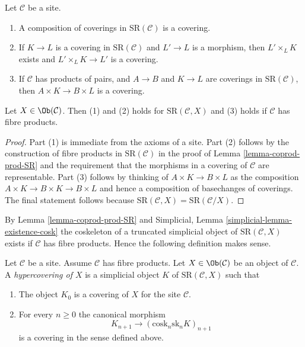 \begin{lemma}
\label{lemma-covering-permanence}
Let $\mathcal{C}$ be a site.
\begin{enumerate}
\item A composition of coverings in $\text{SR}(\mathcal{C})$
is a covering.
\item If $K \to L$ is a covering in $\text{SR}(\mathcal{C})$
and $L' \to L$ is a morphism, then $L' \times_L K$ exists
and $L' \times_L K \to L'$ is a covering.
\item If $\mathcal{C}$ has products of pairs, and
$A \to B$ and $K \to L$ are coverings in $\text{SR}(\mathcal{C})$,
then $A \times K \to B \times L$ is a covering.
\end{enumerate}
Let $X \in \Ob(\mathcal{C})$. Then (1) and (2) holds for
$\text{SR}(\mathcal{C}, X)$ and (3) holds if $\mathcal{C}$
has fibre products.
\end{lemma}

\begin{proof}
Part (1) is immediate from the axioms of a site.
Part (2) follows by the construction of fibre products
in $\text{SR}(\mathcal{C})$ in the proof of
Lemma \ref{lemma-coprod-prod-SR}
and the requirement that the morphisms in a covering
of $\mathcal{C}$ are representable.
Part (3) follows by thinking of $A \times K \to B \times L$
as the composition $A \times K \to B \times K \to B \times L$
and hence a composition of basechanges of coverings.
The final statement follows because $\text{SR}(\mathcal{C}, X) =
\text{SR}(\mathcal{C}/X)$.
\end{proof}

\noindent
By Lemma \ref{lemma-coprod-prod-SR} and
Simplicial, Lemma \ref{simplicial-lemma-existence-cosk}
the coskeleton of a truncated simplicial object of
$\text{SR}(\mathcal{C}, X)$ exists if $\mathcal{C}$ has fibre products.
Hence the following definition makes sense.

\begin{definition}
\label{definition-hypercovering}
Let $\mathcal{C}$ be a site. Assume $\mathcal{C}$ has fibre products.
Let $X \in \Ob(\mathcal{C})$ be an object of $\mathcal{C}$.
A {\it hypercovering of $X$} is a simplicial object
$K$ of $\text{SR}(\mathcal{C}, X)$ such that
\begin{enumerate}
\item The object $K_0$ is a covering of $X$ for the site $\mathcal{C}$.
\item For every $n \geq 0$ the canonical morphism
$$
K_{n + 1} \longrightarrow (\text{cosk}_n \text{sk}_n K)_{n + 1}
$$
is a covering in the sense defined above.
\end{enumerate}
\end{definition}

